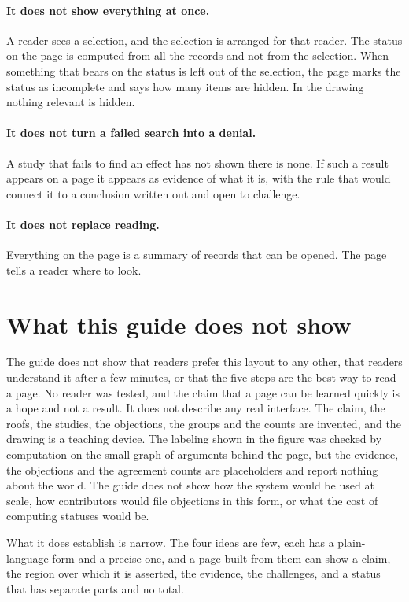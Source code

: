 \documentclass[11pt]{article}
\begin{document}
\paragraph{It does not show everything at once.} A reader sees a selection, and the selection is arranged for that reader. The status on the page is computed from all the records and not from the selection. When something that bears on the status is left out of the selection, the page marks the status as incomplete and says how many items are hidden. In the drawing nothing relevant is hidden.

\paragraph{It does not turn a failed search into a denial.} A study that fails to find an effect has not shown there is none. If such a result appears on a page it appears as evidence of what it is, with the rule that would connect it to a conclusion written out and open to challenge.

\paragraph{It does not replace reading.} Everything on the page is a summary of records that can be opened. The page tells a reader where to look.

\section{What this guide does not show}\label{sec:limits}

The guide does not show that readers prefer this layout to any other, that readers understand it after a few minutes, or that the five steps are the best way to read a page. No reader was tested, and the claim that a page can be learned quickly is a hope and not a result. It does not describe any real interface. The claim, the roofs, the studies, the objections, the groups and the counts are invented, and the drawing is a teaching device. The labeling shown in the figure was checked by computation on the small graph of arguments behind the page, but the evidence, the objections and the agreement counts are placeholders and report nothing about the world. The guide does not show how the system would be used at scale, how contributors would file objections in this form, or what the cost of computing statuses would be.

What it does establish is narrow. The four ideas are few, each has a plain-language form and a precise one, and a page built from them can show a claim, the region over which it is asserted, the evidence, the challenges, and a status that has separate parts and no total.
\end{document}
